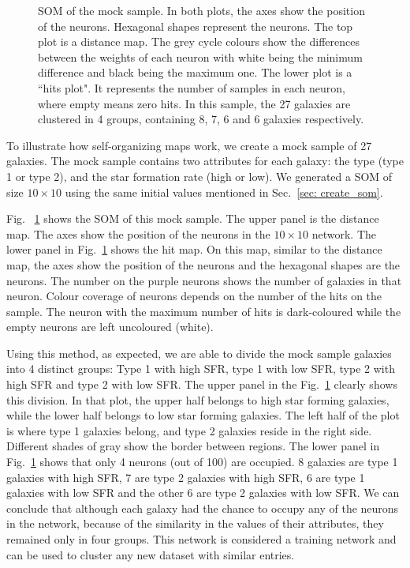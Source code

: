 \begin{figure}
\begin{subfigure}[b]{0.5\textwidth}
            \end{subfigure}
            \caption{SOM of the mock sample. In both plots, the axes show the position of the neurons. Hexagonal shapes represent the neurons. The top plot is a distance map. The grey cycle colours show the differences between the weights of each neuron with white being the minimum difference and black being the maximum one. The lower plot is a ``hits plot". It represents the number of samples in each neuron, where empty means zero hits. In this sample, the 27 galaxies are clustered in 4 groups, containing 8, 7, 6 and 6 galaxies respectively.}
            \label{fig: sample}
        \end{figure}
 
 To illustrate how self-organizing maps work, we create a mock sample of 27 galaxies.
 The mock sample contains two attributes for each galaxy: the type (type 1 or type 2), and the star formation rate (high or low). 
 We generated a SOM of size $10 \times 10$ using the same initial values mentioned in Sec.~\ref{sec: create_som}.

 Fig. ~\ref{fig: sample} shows the SOM of this mock sample. 
 The upper panel is the distance map. 
 The axes show the position of the neurons in the $10 \times 10$ network.
 The lower panel in Fig.~\ref{fig: sample} shows the hit map.
 On this map, similar to the distance map, the axes show the position of the neurons and the hexagonal shapes are the neurons.
 The number on the purple neurons shows the number of galaxies in that neuron.
 Colour coverage of neurons depends on the number of the hits on the sample.
 The neuron with the maximum number of hits is dark-coloured while the empty neurons are left uncoloured (white).
 
Using this method, as expected, we are able to divide the mock sample galaxies into 4 distinct groups: Type 1 with high SFR, type 1 with low SFR, type 2 with high SFR and type 2 with low SFR. 
The upper panel in the Fig.~\ref{fig: sample} clearly shows this division.
In that plot, the upper half belongs to high star forming galaxies, while the lower half belongs to low star forming galaxies.
The left half of the plot is where type 1 galaxies belong, and type 2 galaxies reside in the right side.
Different shades of gray show the border between regions.
The lower panel in Fig.~\ref{fig: sample} shows that only 4 neurons (out of 100) are occupied. 
8 galaxies are type 1 galaxies with high SFR, 7 are type 2 galaxies with high SFR, 6 are type 1 galaxies with low SFR and the other 6 are type 2 galaxies with low SFR. 
We can conclude that although each galaxy had  the chance to occupy any of the neurons in the network, because of the similarity in the values of their attributes, they remained only in four groups.
This network is considered a training network and can be used to cluster any new dataset with similar entries.


